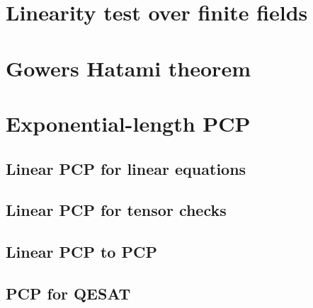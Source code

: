 %

% 


% 
\chapter{Linearity test over finite fields}

%
\chapter{Gowers Hatami theorem}

%   

\chapter{Exponential-length PCP}


\section{Linear PCP for linear equations}

\section{Linear PCP for tensor checks}

\section{Linear PCP to PCP}

\section{PCP for QESAT}
